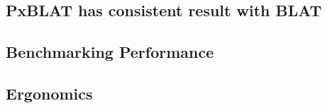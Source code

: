 
\subsection*{PxBLAT has consistent result with BLAT}\label{ssec:pxblat-has-consistent-result-with-blat}


\subsection*{Benchmarking Performance}\label{ssec:benchmarking-performance}



\subsection*{Ergonomics}\label{ssec:ergonomics}




%
%

